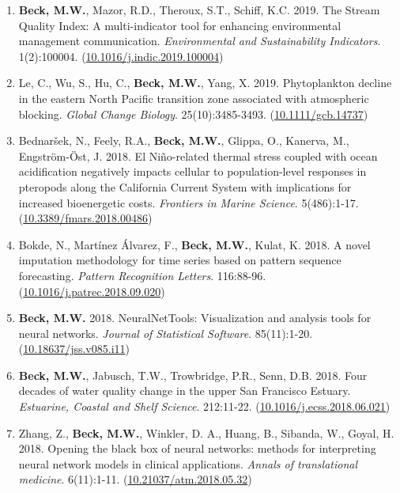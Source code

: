 \documentclass[letterpaper,12pt]{article}
\begin{document}
\begin{enumerate}
\item \textbf{Beck, M.W.}, Mazor, R.D., Theroux, S.T., Schiff, K.C. 2019. The Stream Quality Index: A multi-indicator tool for enhancing environmental management communication. \textit{Environmental and Sustainability Indicators}. 1(2):100004. ({\footnotesize\href{https://doi.org/10.1016/j.indic.2019.100004}{10.1016/j.indic.2019.100004}})

\item Le, C., Wu, S., Hu, C., \textbf{Beck, M.W.}, Yang, X. 2019. Phytoplankton decline in the eastern {N}orth {P}acific transition zone associated with atmospheric blocking. \textit{Global Change Biology}. 25(10):3485-3493. ({\footnotesize\href{https://doi.org/10.1111/gcb.14737}{10.1111/gcb.14737}})

\item Bednar\v{s}ek, N., Feely, R.A., \textbf{Beck, M.W.}, Glippa, O., Kanerva, M., Engstr\"{o}m-\"{O}st, J. 2018. El Ni\~{n}o-related thermal stress coupled with ocean acidification negatively impacts cellular to population-level responses in pteropods along the {C}alifornia {C}urrent {S}ystem with implications for increased bioenergetic costs. \textit{Frontiers in Marine Science}. 5(486):1-17. ({\footnotesize\href{https://doi.org/10.3389/fmars.2018.00486}{10.3389/fmars.2018.00486}})

\item Bokde, N., Mart\'{i}nez \'{A}lvarez, F., \textbf{Beck, M.W.}, Kulat, K. 2018. A novel imputation methodology for time series based on pattern sequence forecasting. \textit{Pattern Recognition Letters}. 116:88-96. ({\footnotesize\href{https://doi.org/10.1016/j.patrec.2018.09.020}{10.1016/j.patrec.2018.09.020}})

\item \textbf{Beck, M.W.} 2018. NeuralNetTools: Visualization and analysis tools for neural networks. \textit{Journal of Statistical Software}. 85(11):1-20. ({\footnotesize\href{http://dx.doi.org/10.18637/jss.v085.i11}{10.18637/jss.v085.i11}})

\item \textbf{Beck, M.W.}, Jabusch, T.W., Trowbridge, P.R., Senn, D.B. 2018. Four decades of water quality change in the upper San Francisco Estuary. \textit{Estuarine, Coastal and Shelf Science}. 212:11-22. ({\footnotesize\href{https://doi.org/10.1016/j.ecss.2018.06.021}{10.1016/j.ecss.2018.06.021}})

\item Zhang, Z., \textbf{Beck, M.W.}, Winkler, D. A., Huang, B., Sibanda, W., Goyal, H. 2018. Opening the black box of neural networks: methods for interpreting neural network models in clinical applications. \textit{Annals of translational medicine}. 6(11):1-11. ({\footnotesize\href{http://dx.doi.org/10.21037/atm.2018.05.32}{10.21037/atm.2018.05.32}})


\end{enumerate}
\end{document}
